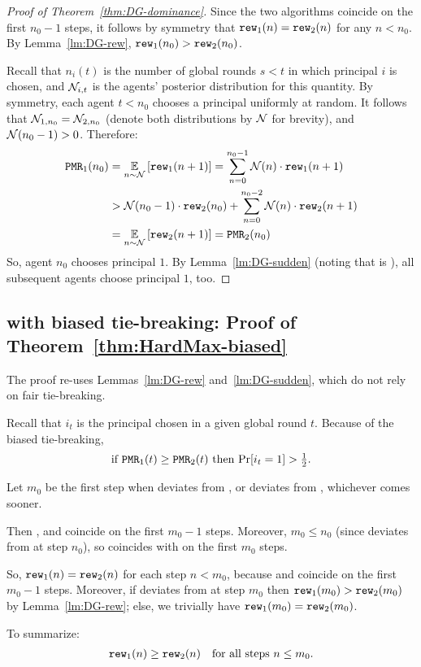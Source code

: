 \begin{proof}[Proof of Theorem~\ref{thm:DG-dominance}]
Since the two algorithms coincide on the first $n_0-1$ steps, it follows by symmetry that $\mathtt{rew}_1(n) = \mathtt{rew}_2(n)$ for any $n< n_0$.
By Lemma~\ref{lm:DG-rew},
    $\mathtt{rew}_1(n_0) > \mathtt{rew}_2(n_0)$.

Recall that $n_i(t)$ is the number of global rounds $s<t$ in which principal $i$ is chosen, and $\mathcal{N}_{i,t}$ is the agents' posterior distribution for this quantity. By symmetry, each agent $t<n_0$ chooses a principal uniformly at random. It follows that
    $\mathcal{N}_{1,n_0} = \mathcal{N}_{2,n_0}$
(denote both distributions by $\mathcal{N}$ for brevity), and $\mathcal{N}(n_0-1)>0$.
Therefore:
\begin{align}
\PMR_1(n_0)
  &= \Ex{n\sim \mN} {\rew_1(n+ 1)}
   = \sum_{n = 0}^{n_0-1} \mN(n) \cdot{\rew_1(n + 1)} \nonumber \\
  & > \mN(n_0-1)\cdot {\rew_2(n_0)} + \sum_{n = 0}^{n_0-2}  \mN(n)\cdot{\rew_2(n + 1)}
    \nonumber \\
  &= \Ex{n\sim \mN}{\rew_2(n + 1)} = \PMR_2(n_0) \label{eq:pf:thm:DG-dominance}
\end{align}
So, agent $n_0$ chooses principal $1$. By Lemma~\ref{lm:DG-sudden} {(noting that \DynGreedy is \bmonotone)}, all subsequent agents choose principal $1$, too.
\end{proof}

\subsection{\HardMax with biased tie-breaking:
Proof of Theorem~\ref{thm:HardMax-biased}}
\label{sec:proofs-HM-main-biased}

The proof re-uses Lemmas~\ref{lm:DG-rew} and~\ref{lm:DG-sudden}, which do not rely on fair tie-breaking.

Recall that $i_t$ is the principal chosen in a given global round $t$.
Because of the biased tie-breaking,
\begin{align}\label{eq:thm:HardMax-biased-PMRtoPr}
\text{if $\mathtt{PMR}_1(t)\geq \mathtt{PMR}_2(t)$ then $\Pr[i_t=1]>\tfrac12$.}
\end{align}

Let $m_0$ be the first step when \alg[2] deviates from \DynGreedy, or \DynGreedy deviates from \StaticGreedy, whichever comes sooner. {Then \alg[2], \DynGreedy and \StaticGreedy coincide on the first $m_0-1$ steps. Moreover, $m_0\leq n_0$ (since \DynGreedy deviates from \StaticGreedy at step $n_0$), so \alg[1] coincides with \DynGreedy on the first $m_0$ steps.

So, $\mathtt{rew}_1(n)=\mathtt{rew}_2(n)$ for each step $n<m_0$, because \alg[1] and \alg[2] coincide on the first $m_0-1$ steps. Moreover, if \alg[2] deviates from \DynGreedy at step $m_0$ then
    $\mathtt{rew}_1(m_0) > \mathtt{rew}_2(m_0)$
by Lemma~\ref{lm:DG-rew}; else, we trivially have
    $\mathtt{rew}_1(m_0) = \mathtt{rew}_2(m_0)$.} To summarize:
\begin{align}\label{eq:thm:HardMax-biased-rew}
    \mathtt{rew}_1(n)\geq\mathtt{rew}_2(n)\quad \text{for all steps $n\leq m_0$}.
\end{align}

